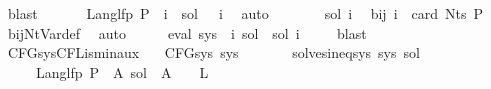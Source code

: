 \begin{isabellebody}
\ blast\isanewline
\ \ \isamarkupfalse%
\ {\isacharasterisk}{\kern0pt}\ \isamarkupfalse%
\ {\isachardoublequoteopen}Lang{\isacharunderscore}{\kern0pt}lfp\ P\ {\isacharparenleft}{\kern0pt}{\isasymgamma}\ i{\isacharparenright}{\kern0pt}\ {\isacharequal}{\kern0pt}\ sol\ {\isacharparenleft}{\kern0pt}{\isasymgamma}{\isacharprime}{\kern0pt}\ {\isacharparenleft}{\kern0pt}{\isasymgamma}\ i{\isacharparenright}{\kern0pt}{\isacharparenright}{\kern0pt}{\isachardoublequoteclose}\ \isamarkupfalse%
\ auto\isanewline
\ \ \isamarkupfalse%
\ \isamarkupfalse%
\ {\isachardoublequoteopen}{\isasymdots}\ {\isacharequal}{\kern0pt}\ sol\ i{\isachardoublequoteclose}\ \isamarkupfalse%
\ bij{\isacharunderscore}{\kern0pt}{\isasymgamma}{\isacharunderscore}{\kern0pt}{\isasymgamma}{\isacharprime}{\kern0pt}\ {\isacartoucheopen}i\ {\isacharless}{\kern0pt}\ card\ {\isacharparenleft}{\kern0pt}Nts\ P{\isacharparenright}{\kern0pt}{\isacartoucheclose}\ \isamarkupfalse%
\ bij{\isacharunderscore}{\kern0pt}Nt{\isacharunderscore}{\kern0pt}Var{\isacharunderscore}{\kern0pt}def\ \isamarkupfalse%
\ auto\isanewline
\ \ \isamarkupfalse%
\ \isamarkupfalse%
\ {\isachardoublequoteopen}eval\ {\isacharparenleft}{\kern0pt}sys\ {\isacharbang}{\kern0pt}\ i{\isacharparenright}{\kern0pt}\ sol\ {\isasymsubseteq}\ sol\ i{\isachardoublequoteclose}\ \isamarkupfalse%
\ {}\ \isamarkupfalse%
\ blast\isanewline
{}\isamarkupfalse%
%
\endisatagproof
{\isafoldproof}%
%
\isadelimproof
\isanewline
%
\endisadelimproof
\isanewline
{}\isamarkupfalse%
\ CFG{\isacharunderscore}{\kern0pt}sys{\isacharunderscore}{\kern0pt}CFL{\isacharunderscore}{\kern0pt}is{\isacharunderscore}{\kern0pt}min{\isacharunderscore}{\kern0pt}aux{\isacharcolon}{\kern0pt}\isanewline
\ \ \ {\isachardoublequoteopen}CFG{\isacharunderscore}{\kern0pt}sys\ sys{\isachardoublequoteclose}\isanewline
\ \ \ \ \ \ \ {\isachardoublequoteopen}solves{\isacharunderscore}{\kern0pt}ineq{\isacharunderscore}{\kern0pt}sys\ sys\ sol{\isacharprime}{\kern0pt}{\isachardoublequoteclose}\isanewline
\ \ \ \ \ {\isachardoublequoteopen}Lang{\isacharunderscore}{\kern0pt}lfp\ P\ {\isasymle}\ {\isacharparenleft}{\kern0pt}{\isasymlambda}A{\isachardot}{\kern0pt}\ sol{\isacharprime}{\kern0pt}\ {\isacharparenleft}{\kern0pt}{\isasymgamma}{\isacharprime}{\kern0pt}\ A{\isacharparenright}{\kern0pt}{\isacharparenright}{\kern0pt}{\isachardoublequoteclose}\ {\isacharparenleft}{\kern0pt}\ {\isachardoublequoteopen}{\isacharunderscore}{\kern0pt}\ {\isasymle}\ {\isacharquery}{\kern0pt}L{\isacharprime}{\kern0pt}{\isachardoublequoteclose}{\isacharparenright}{\kern0pt}\isanewline

\end{isabellebody}
